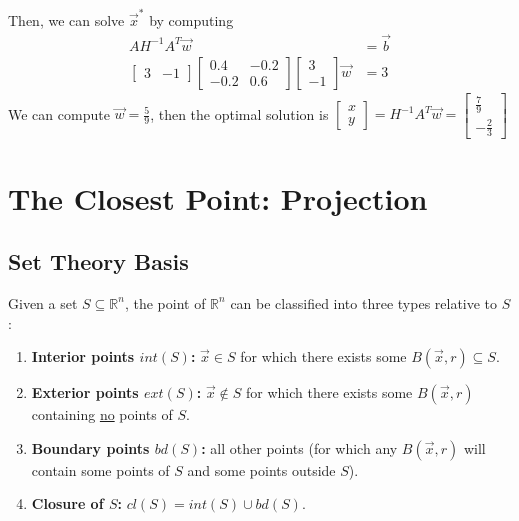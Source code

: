 \documentclass[11pt,a4paper]{article}
\begin{document}
Then, we can solve $\vec{x}^*$ by computing
\begin{equation}
    \begin{aligned}
        A H^{-1}A^T \vec{w}&= \vec{b}\\
        \begin{bmatrix}
            3&-1
        \end{bmatrix}
        \begin{bmatrix}
            0.4&-0.2\\
            -0.2&0.6
        \end{bmatrix}
        \begin{bmatrix}
            3\\
            -1
        \end{bmatrix}\vec{w}&=3
    \end{aligned}
    \nonumber
\end{equation}
We can compute $\vec{w}=\frac{5}{9}$, then the optimal solution is $\begin{bmatrix}
    x\\
    y
\end{bmatrix}=H^{-1}A^T \vec{w}=\begin{bmatrix}
    \frac{7}{9}\\
    -\frac{2}{3}
\end{bmatrix}$

















\section{The Closest Point: Projection}
\subsection{Set Theory Basis}
Given a set $S\subseteq \mathbb{R}^n$, the point of $\mathbb{R}^n$ can be classified into three types relative to $S$:
\begin{enumerate}[$\bullet$]
    \item \textbf{Interior points $int(S)$:} $\vec{x}\in S$ for which there exists some $B(\vec{x},r)\subseteq S$.
    \item \textbf{Exterior points $ext(S)$:} $\vec{x}\notin S$ for which there exists some $B(\vec{x},r)$ containing \underline{no} points of $S$.
    \item \textbf{Boundary points $bd(S)$:} all other points (for which any $B(\vec{x},r)$ will contain some points of $S$ and some points outside $S$).
    \item \textbf{Closure of $S$:} $cl(S)=int(S)\cup bd(S)$.
\end{enumerate}
\end{document}

